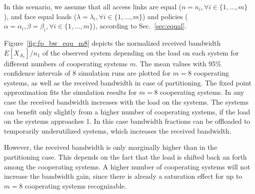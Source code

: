 In this scenario, we assume that all access links are equal ($n=n_i, \forall i\in\{1,\ldots,m\}$), and face equal loads ($\lambda=\lambda_i, \forall i\in\{1,\ldots,m\}$) and policies ($\alpha = \alpha_i, \beta = \beta_i, \forall i\in\{1,\ldots,m\}$), according to Sec.~\ref{sec:equal}.

Figure~\ref{fig:fp_bw_equ_m8} depicts the normalized received bandwidth $E[X_{A_1}]/n_1$ of the observed system depending on the load on each system for different numbers of cooperating systems $m$. The mean values with 95\% confidence intervals of 8 simulation runs are plotted for $m=8$ cooperating systems, as well as the received bandwidth in case of partitioning.
The fixed point approximation fits the simulation results for $m=8$ cooperating systems.
In any case the received bandwidth increases with the load on the systems.
The systems can benefit only slightly from a higher number of cooperating systems, if the load on the systems approaches 1.
In this case bandwidth fractions can be offloaded to temporarily underutilized systems, which increases the received bandwidth.

However, the received bandwidth is only marginally higher than in the partitioning case.
This depends on the fact that the load is shifted back an forth among the cooperating systems.
A higher number of cooperating systems will not increase the bandwidth gain, since there is already a saturation effect for up to $m=8$ cooperating systems recognizable.
